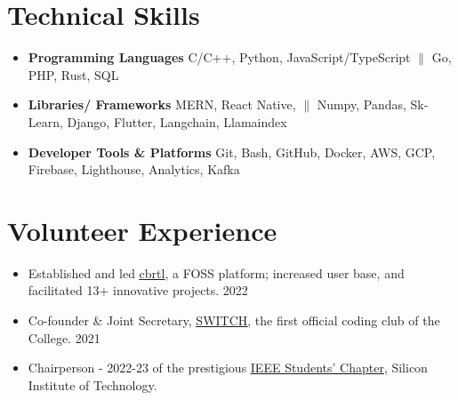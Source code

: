 \documentclass[letterpaper,11pt]{article}
\newcommand{\resumeItem}[1]{
  \item\small{
    {#1 \vspace{-2pt}}
  }
}
\newcommand{\resumeSubItem}[1]{\resumeItem{#1}\vspace{-4pt}}
\newcommand{\resumeSubHeadingListStart}{\begin{itemize}[leftmargin=0.15in, label={}]}
\newcommand{\resumeSubHeadingListEnd}{\end{itemize}}
\begin{document}
%

\section{Technical Skills}
  \resumeSubHeadingListStart
    \resumeSubItem{\textbf{Programming Languages}}
      {C/C++, Python, JavaScript/TypeScript $\|$ Go, PHP, Rust, SQL}
    \resumeSubItem{\textbf{Libraries/ Frameworks}}
      {MERN, React Native, $\|$ Numpy, Pandas, Sk-Learn, Django, Flutter, Langchain, Llamaindex }
    \resumeSubItem{\textbf{Developer Tools \& Platforms}}
      {Git, Bash, GitHub, Docker, AWS, GCP, Firebase, Lighthouse, Analytics, Kafka}
  \resumeSubHeadingListEnd


%

\section{Volunteer Experience}
  \resumeSubHeadingListStart
    \resumeSubItem
    {Established and led \href{https://cbrtl.github.io}{\underline{cbrtl}}, a FOSS platform; increased user base, and facilitated 13+ innovative projects. 2022}
    \resumeSubItem
      {Co-founder \& Joint Secretary, \href{https://www.linkedin.com/company/switch-sit/}{\underline{SWITCH}}, the first official coding club of the College. 2021}
    \resumeSubItem
      {Chairperson - 2022-23 of the prestigious \href{https://www.instagram.com/ieeesitbbsr/}{\underline{IEEE Students’ Chapter}}, Silicon Institute of Technology.}
  \resumeSubHeadingListEnd

%


\end{document}

